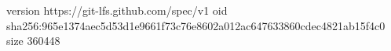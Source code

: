 version https://git-lfs.github.com/spec/v1
oid sha256:965e1374aec5d53d1e9661f73c76e8602a012ac647633860cdec4821ab15f4c0
size 360448
